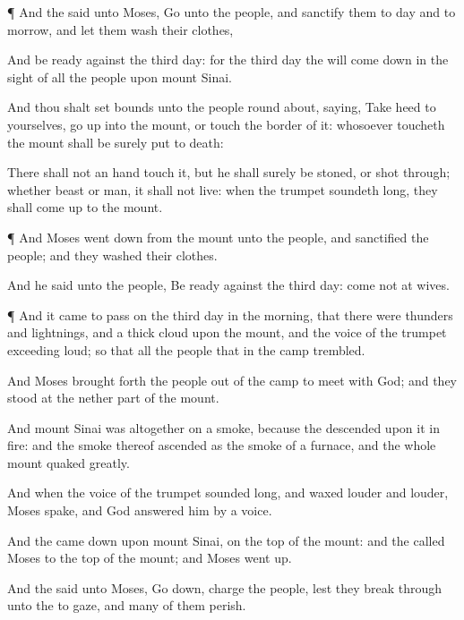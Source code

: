 {\par }{\PP {}¶ And the
{}
said unto
Moses,
Go unto the
people, and
sanctify them to
day and to
morrow, and let them
wash their
clothes,

And be
ready against the
third
day: for the
third
day the
{} will come
down in the
sight of all the
people upon
mount
Sinai.

And thou shalt set
bounds unto the
people round
about,
saying, Take
heed to yourselves,
{} go
{}
up into the
mount, or
touch the
border of it: whosoever
toucheth the
mount shall be
surely put to
death:

There shall not an
hand
touch it, but he shall
surely be
stoned,
or
shot
through; whether
{}
beast
or
man, it shall not
live: when the
trumpet soundeth
long, they shall come
up to the
mount.


\par }{\PP {}¶ And
Moses went
down from the
mount unto the
people, and
sanctified the
people; and they
washed their
clothes.

And he
said unto the
people,
Be
ready against the
third
day:
come not at
{}
wives.


\par }{\PP {}¶ And it came to pass on the
third
day in the
morning, that there were
thunders and
lightnings, and a
thick
cloud upon the
mount, and the
voice of the
trumpet
exceeding
loud; so that all the
people that
{} in the
camp
trembled.

And
Moses brought
forth the
people out of the
camp to
meet with
God; and they
stood at the
nether part of the
mount.

And
mount
Sinai was altogether on a
smoke,
because the
{}
descended upon it in
fire: and the
smoke thereof
ascended as the
smoke of a
furnace, and the whole
mount
quaked
greatly.

And when the
voice of the
trumpet
sounded
long, and waxed
louder and
louder,
Moses
spake, and
God
answered him by a
voice.

And the
{} came
down upon
mount
Sinai, on the
top of the
mount: and the
{}
called
Moses
{}
to the
top of the
mount; and
Moses went
up.

And the
{}
said unto
Moses, Go
down,
charge the
people, lest they break
through unto the
{} to
gaze, and
many of them
perish.

}
